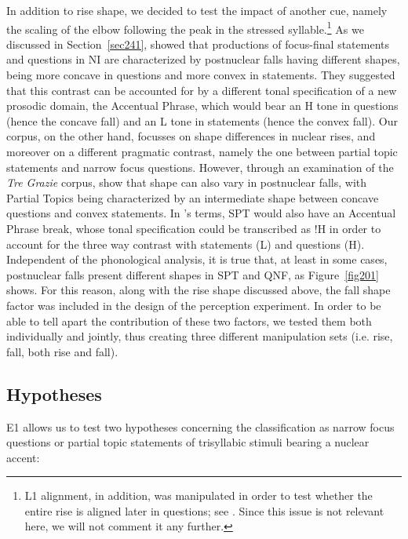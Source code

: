 In addition to rise shape, we decided to test the impact of another cue, namely the scaling of the elbow following the peak in the stressed syllable.\footnote{L1 alignment, in addition, was manipulated in order to test whether the entire rise is aligned later in questions; see \citet{dimperio2003tonal}. Since this issue is not relevant here, we will not comment it any further.\label{footnoteL1}} As we discussed in Section~\ref{sec241}, \citet{petrone2008tonal} showed that productions of focus-final statements and questions in NI are characterized by postnuclear falls having different shapes, being more concave in questions and more convex in statements. They suggested that this contrast can be accounted for by a different tonal specification of a new prosodic domain, the Accentual Phrase, which would bear an H tone in questions (hence the concave fall) and an L tone in statements (hence the convex fall). Our corpus, on the other hand, focusses on shape differences in nuclear rises, and moreover on a different pragmatic contrast, namely the one between partial topic statements and narrow focus questions. However, through an examination of the \textit{Tre Grazie} corpus, \citet{dimperio2011phrasing} show that shape can also vary in postnuclear falls, with Partial Topics being characterized by an intermediate shape between concave questions and convex statements. In \citeauthor{petrone2008tonal}'s \citeyearpar{petrone2008tonal} terms, SPT would also have an Accentual Phrase break, whose tonal specification could be transcribed as !H in order to account for the three way contrast with statements (L) and questions (H). Independent of the phonological analysis, it is true that, at least in some cases, postnuclear falls present different shapes in SPT and QNF, as Figure~\ref{fig201} shows. For this reason, along with the rise shape discussed above, 
the fall shape factor was included in the design of the perception experiment. In order to be able to tell apart the contribution of these two factors, we tested them both individually and jointly, thus creating three different manipulation sets (i.e. rise, fall, both rise and fall).

\subsection{Hypotheses}\label{sec320}
E1 allows us to test two hypotheses concerning the classification as narrow focus questions or partial topic statements of trisyllabic stimuli bearing a nuclear accent:

